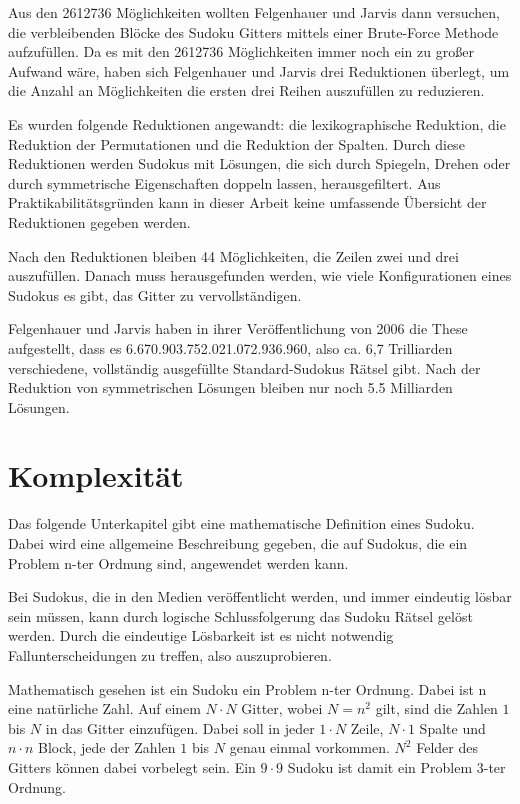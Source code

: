 Aus den 2612736 Möglichkeiten wollten Felgenhauer und Jarvis dann versuchen, die verbleibenden Blöcke des Sudoku Gitters mittels einer Brute-Force Methode aufzufüllen. Da es mit den 2612736 Möglichkeiten immer noch ein zu großer Aufwand wäre, haben sich Felgenhauer und Jarvis drei Reduktionen überlegt, um die Anzahl an Möglichkeiten die ersten drei Reihen auszufüllen zu reduzieren.

Es wurden folgende Reduktionen angewandt: die lexikographische Reduktion, die Reduktion der Permutationen und die Reduktion der Spalten. Durch diese Reduktionen werden Sudokus mit Lösungen, die sich durch Spiegeln, Drehen oder durch symmetrische Eigenschaften doppeln lassen, herausgefiltert. Aus Praktikabilitätsgründen kann in dieser Arbeit keine umfassende Übersicht der Reduktionen gegeben werden.

Nach den Reduktionen bleiben 44 Möglichkeiten, die Zeilen zwei und drei auszufüllen. Danach muss herausgefunden werden, wie viele Konfigurationen eines Sudokus es gibt, das Gitter zu vervollständigen. 

Felgenhauer und Jarvis haben in ihrer Veröffentlichung von 2006 die These aufgestellt, dass es 6.670.903.752.021.072.936.960, also ca. 6,7 Trilliarden  verschiedene, vollständig ausgefüllte Standard-Sudokus Rätsel gibt. Nach der Reduktion von symmetrischen Lösungen bleiben nur noch 5.5 Milliarden Lösungen. \cite{FelgenhauerJarvis} \cite[90\psqq]{althofer2014spiele}

\section{Komplexität}
Das folgende Unterkapitel gibt eine mathematische Definition eines Sudoku. Dabei wird eine allgemeine Beschreibung gegeben, die auf Sudokus, die ein Problem n-ter Ordnung sind, angewendet werden kann.

Bei Sudokus, die in den Medien veröffentlicht werden, und immer eindeutig lösbar sein müssen, kann durch logische Schlussfolgerung das Sudoku Rätsel gelöst werden. Durch die eindeutige Lösbarkeit ist es nicht notwendig Fallunterscheidungen zu treffen, also auszuprobieren.

Mathematisch gesehen ist ein Sudoku ein Problem n-ter Ordnung. Dabei ist n eine natürliche Zahl. Auf einem $N\cdot N$ Gitter, wobei $N=n^2$ gilt, sind die Zahlen $1$ bis $N$ in das Gitter einzufügen. Dabei soll in jeder $1\cdot N$ Zeile, $N\cdot 1$ Spalte und $n\cdot n$ Block, jede der Zahlen $1$ bis $N$ genau einmal vorkommen. $N^2$ Felder des Gitters können dabei vorbelegt sein. Ein $9\cdot9$ Sudoku ist damit ein Problem 3-ter Ordnung. \cite{HerzbergMurty} 


